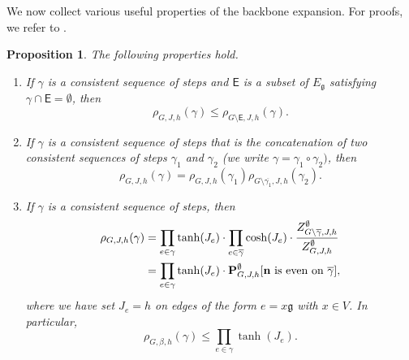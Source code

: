 \documentclass[11pt,a4paper]{article}
\numberwithin{equation}{section}
\theoremstyle{plain}
\newtheorem{Prop}[Thm]{Proposition}
\theoremstyle{definition}
\newcommand\n{\mathbf{n}}
\newcommand\fg{\mathfrak{g}}
\begin{document}
We now collect various useful properties of the backbone expansion. For proofs, we refer to \cite[Proposition~4.4]{AizenmanFernandezCriticalBehaviorMagnetization1986}. 

\begin{Prop}The following properties hold.
\label{prop:backbone}
\begin{enumerate}
	\item[$\bullet$] If $\gamma$ is a consistent sequence of steps and $\mathsf E$ is a subset of $E_\fg$ satisfying $\gamma\cap \mathsf E=\emptyset$, then
	\begin{equation}\label{eq:propbackb1}
		\rho_{G,J,h}(\gamma)\leq \rho_{G\setminus\mathsf E,J,h}(\gamma).
	\end{equation}
	\item[$\bullet$] If $\gamma$ is a consistent sequence of steps that is the concatenation of two consistent sequences of steps $\gamma_1$ and $\gamma_2$ (we write $\gamma=\gamma_1\circ \gamma_2)$, then
	\begin{equation}\label{eq:propbackb2}
		\rho_{G,J,h}(\gamma)=\rho_{G,J,h}(\gamma_1)\rho_{G\setminus \overline{\gamma_1},J,h}(\gamma_2).
	\end{equation}
	\item[$\bullet$] If $\gamma$ is a consistent sequence of steps, then
	\begin{align}\label{eq:formula backbone weight}
	\begin{aligned}	
		\rho_{G,J,h}(\gamma)&=\prod_{e\in \gamma}\tanh(J_e)\cdot\prod_{e\in \overline{\gamma}}\cosh(J_e)\cdot\frac{Z_{G\setminus \overline{\gamma},J,h}^\emptyset}{Z_{G,J,h}^\emptyset}\\&=\prod_{e\in \gamma}\tanh(J_e)\cdot\mathbf P^{\emptyset}_{G,J,h}[\n \textup{ is even on }\overline{\gamma}],
		\end{aligned}
	\end{align}
	where we have set $J_e=h$ on edges of the form $e=x\fg$ with $x\in V$. In particular, 
	\begin{equation}
	\rho_{G,\beta,h}(\gamma)\leq \prod_{e\in \gamma}\tanh(J_e).
	\end{equation} 
\end{enumerate}
\end{Prop}
\end{document}

